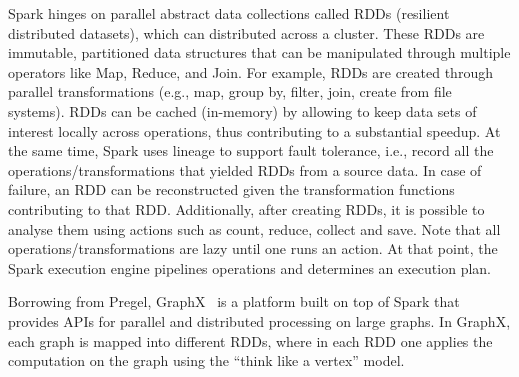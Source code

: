 Spark hinges on parallel abstract data collections called RDDs (resilient distributed datasets), which can distributed across a cluster. These RDDs are immutable, partitioned data structures that can be manipulated through multiple operators like Map, Reduce, and Join. For example, RDDs are created through parallel transformations (e.g., map, group by, filter, join, create from file systems). RDDs can be cached (in-memory) by allowing to keep data sets of interest locally across operations, thus contributing to a substantial speedup. At the same time, Spark uses lineage to support fault tolerance, i.e., record all the operations/transformations that yielded RDDs from a source data. In case of failure, an RDD can be reconstructed given the transformation functions contributing to that RDD. Additionally, after creating RDDs, it is possible to analyse them using actions such as count, reduce, collect and save. Note that all operations/transformations are lazy until one runs an action. At that point, the Spark execution engine pipelines operations and determines an execution plan.

Borrowing from Pregel, GraphX~\cite{graphx} is a platform built on top of Spark that provides APIs for parallel and distributed processing on large graphs. In GraphX, each graph is mapped into different RDDs, where in each RDD one applies the computation on the graph using the “think like a vertex” model. 

